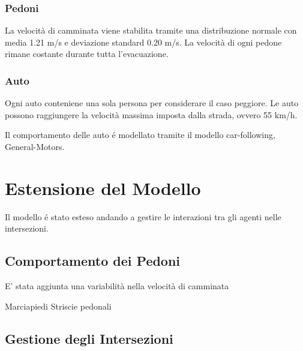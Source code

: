 \subsubsection{Pedoni}
La velocità di camminata viene stabilita tramite una distribuzione normale
con media 1.21 m/s e deviazione standard 0.20 m/s.
La velocità di ogni pedone rimane costante durante tutta l'evacuazione.


\subsubsection{Auto}
Ogni auto conteniene una sola persona per considerare il caso peggiore.
Le auto possono raggiungere la velocità massima imposta dalla strada, ovvero 55 km/h.

Il comportamento delle auto é modellato tramite il modello car-following, General-Motors.

\section{Estensione del Modello}
Il modello é stato esteso andando a gestire le interazioni tra gli agenti nelle intersezioni.

\subsection{Comportamento dei Pedoni}
E' stata aggiunta una variabilità nella velocità di camminata

Marciapiedi
Striscie pedonali

\subsection{Gestione degli Intersezioni}
